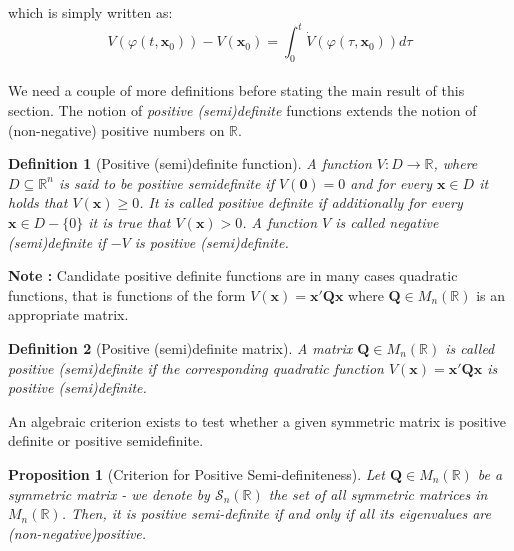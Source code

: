 \documentclass[a4paper,10pt,oneside]{book}
\newtheorem{definition}{Definition}
\newtheorem{proposition}[theorem]{Proposition}
\begin{document}
which is simply written as:
\begin{equation}
 V(\varphi(t,\mathbf{x}_0))-V(\mathbf{x}_0)=\int_0^t \dot{V}(\varphi(\tau,\mathbf{x}_0))d\tau \label{eqn:33129076824}
\end{equation}
\\
We need a couple of more definitions before stating the main result of this section. The notion of \emph{positive (semi)definite} functions extends the notion of (non-negative) positive numbers on $\mathbb{R}$.
%
%
\begin{definition}[Positive (semi)definite function]
 A function $V:D\to\mathbb{R}$, where $D\subseteq\mathbb{R}^n$ is said to be positive semidefinite if $V(\mathbf{0})=0$ and for every $\mathbf{x}\in D$ it holds that $V(\mathbf{x})\geq 0$. It is called positive definite if additionally for every $\mathbf{x}\in D-\{0\}$ it is true that $V(\mathbf{x})>0$. A function $V$ is called negative (semi)definite if $-V$ is positive (semi)definite.
\end{definition}
\noindent \textbf{Note :} Candidate positive definite functions are in many cases quadratic functions, that is functions of the form $V(\mathbf{x})=\mathbf{x}'\mathbf{Qx}$ where $\mathbf{Q}\in M_n(\mathbb{R})$ is an appropriate matrix.
%
%
\begin{definition}[Positive (semi)definite matrix]
 A matrix $\mathbf{Q}\in M_n(\mathbb{R})$ is called positive (semi)definite if the corresponding quadratic function $V(\mathbf{x})=\mathbf{x}'\mathbf{Qx}$ is positive (semi)definite.
\end{definition}
An algebraic criterion exists to test whether a given symmetric matrix is positive definite or positive semidefinite.
%
%
\begin{proposition}[Criterion for Positive Semi-definiteness]
 Let $\mathbf{Q}\in M_n(\mathbb{R})$ be a symmetric matrix - we denote by $\mathcal{S}_n(\mathbb{R})$ the set of all symmetric matrices in $M_n(\mathbb{R})$. Then, it is positive semi-definite if and only if all its eigenvalues are (non-negative)positive.
\end{proposition}
%
\end{document}
